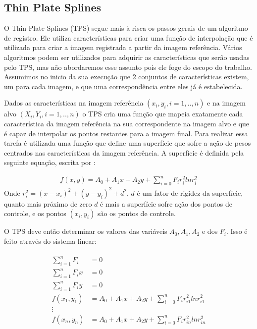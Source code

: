 \subsection{Thin Plate Splines}
    O Thin Plate Splines (TPS) segue mais à risca os passos gerais de um algoritmo de registro. Ele utiliza
características para criar uma função de interpolação que é utilizada para criar a imagem registrada a partir
da imagem referência. Vários algoritmos podem ser utilizados para adquirir as características que serão usadas
pelo TPS, mas não abordaremos esse assunto pois ele foge do escopo do trabalho. Assumimos no inicio da sua
execução que 2 conjuntos de características existem, um para cada imagem, e que uma correspondência entre
eles já é estabelecida.

    Dados as características na imagem referência $(x_i,y_i, i=1,..,n)$ e na imagem alvo $(X_i,Y_i, i=1,..,n)$
o TPS cria uma função que mapeia exatamente cada característica da imagem referência na sua
correspondente na imagem alvo e que é capaz de interpolar os pontos restantes para a imagem final. Para realizar
essa tarefa é utilizada uma função que define uma superfície que sofre a ação de pesos centrados nas
características da imagem referência. A superfície é definida pela seguinte equação, escrita por \cite{bookstein1989principal}:

\begin{align}\label{math:tps}
    f(x,y) = A_0 + A_1x + A_2y + \sum_{i=0}^n F_i r_i^2 ln r_i^2
\end{align}
Onde $r_i^2 = (x-x_i)^2 + (y-y_i)^2 + d^2$, $d$ é um fator de rigidez da superfície, quanto mais próximo de 
zero $d$ é mais a superfície sofre ação dos pontos de controle, e os pontos $(x_i, y_i)$ são os pontos de controle.

    O TPS deve então determinar os valores das variáveis $A_0, A_1, A_2$ e dos $F_i$. 
Isso é feito através do sistema linear:

\begin{align}
\begin{split}
    \sum_{i=1}^n F_i &= 0 \\
    \sum_{i=1}^n F_ix &= 0 \\
    \sum_{i=1}^n F_iy &= 0 \\
    f(x_1,y_1) &= A_0 + A_1x + A_2y + \sum_{i=0}^n F_i r_{i1}^2 ln r_{i1}^2 \\
    \vdots \\
    f(x_n,y_n) &= A_0 + A_1x + A_2y + \sum_{i=0}^n F_i r_{in}^2 ln r_{in}^2
\end{split}
\end{align}

